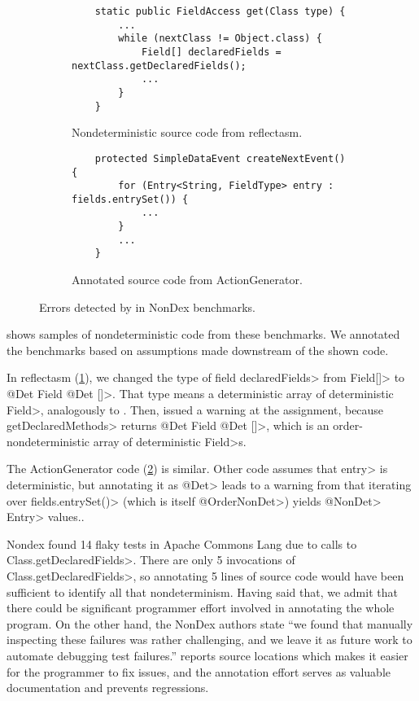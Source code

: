 \begin{figure}
    \centering
    \begin{subfigure}[b]{0.95\textwidth}
        \begin{verbatim}
    static public FieldAccess get(Class type) {
        ...
        while (nextClass != Object.class) {
            Field[] declaredFields = nextClass.getDeclaredFields();
            ...
        }
    }
        \end{verbatim}
        \caption{Nondeterministic source code from reflectasm.\vspace{0.5cm}}
        \label{code-reflectasm}
    \end{subfigure}

    \begin{subfigure}[b]{0.95\textwidth}
        \begin{verbatim}
    protected SimpleDataEvent createNextEvent() {
        for (Entry<String, FieldType> entry : fields.entrySet()) {
            ...
        }
        ...
    }
        \end{verbatim}
        \caption{Annotated source code from ActionGenerator.}
        \label{code-actiongenerator}
    \end{subfigure}    
    \caption{Errors detected by \TheDeterminismChecker in NonDex benchmarks.}
    \label{fig:nondex-source}
\end{figure}


 shows samples of nondeterministic code from these
benchmarks.
We annotated the benchmarks based on 
assumptions made downstream of the shown code.

In reflectasm (\cref{code-reflectasm}), we changed the type of field
\<declaredFields> from \<Field[]> to \<@Det Field @Det []>.  That type
means a deterministic array of deterministic \<Field>, analogously to
.  Then, \theDeterminismChecker issued a
warning at the assignment, because \<getDeclaredMethods> returns \<@Det
Field @Det []>, which is an order-nondeterministic array of deterministic
\<Field>s.

The ActionGenerator code (\cref{code-actiongenerator}) is similar.  Other
code assumes that \<entry> is deterministic, but annotating it as \<@Det>
leads to a warning from \theDeterminismChecker that iterating over
\<fields.entrySet()> (which is itself \<@OrderNonDet>) yields \<@NonDet>
\<Entry> values..

Nondex found 14 flaky tests in Apache Commons Lang due to calls
to \<Class.getDeclaredFields>. 
There are only 5 invocations of \<Class.getDeclaredFields>, so annotating 5 lines of source code
would have been sufficient to identify all that nondeterminism.
Having said that, we admit that there could be
significant programmer effort involved in annotating the whole program. On
the other hand, the NonDex authors
state ``we found that manually inspecting these failures was
rather challenging, and we leave it as future work to automate
debugging test failures.''
\TheDeterminismChecker reports source locations
which makes it easier for the programmer to fix issues, and the annotation
effort serves as valuable documentation and prevents regressions.

